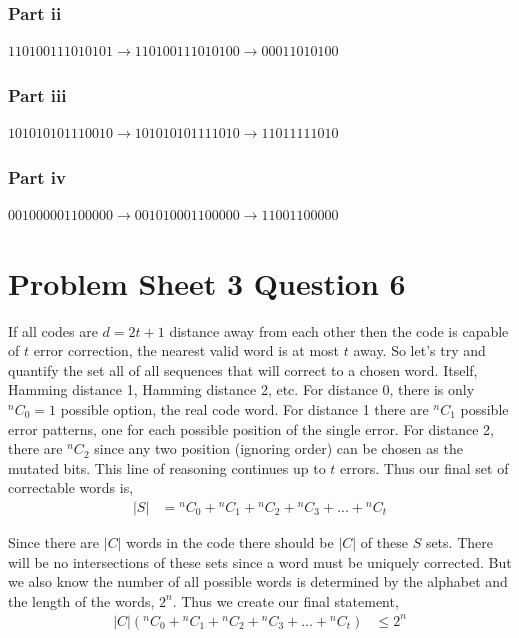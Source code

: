 \documentclass{article}
\begin{document}
\subsubsection{Part ii}
$110100111010101 \to 110100111010100 \to 00011010100$

\subsubsection{Part iii}
$101010101110010 \to 101010101111010 \to 11011111010$

\subsubsection{Part iv}
$001000001100000 \to 001010001100000 \to 11001100000$

\section{Problem Sheet 3 Question 6}
If all codes are $d=2t+1$ distance away from each other then the code is
capable of $t$ error correction, the nearest valid word is at most $t$ away.
So let's try and quantify the set all of all sequences that will correct to
a chosen word. Itself, Hamming distance 1, Hamming distance 2, etc.
For distance 0, there is only ${}^nC_0= 1$ possible option, the real code word.
For distance 1 there are ${}^nC_1$ possible error patterns, one for each
possible position of the single error. For distance 2, there are ${}^nC_2$
since any two position (ignoring order) can be chosen as the mutated bits.
This line of reasoning continues up to $t$ errors. Thus our final set of
correctable words is,
\begin{align*}
    |S| &= {}^nC_0 + {}^nC_1 + {}^nC_2 + {}^nC_3 + ... + {}^nC_t
\end{align*}

Since there are $|C|$ words in the code there should be $|C|$ of these $S$
sets. There will be no intersections of these sets since a word must be
uniquely corrected. But we also know the number of all possible words is
determined by the alphabet and the length of the words, $2^n$. Thus we
create our final statement,
\begin{align*}
    |C|\left({}^nC_0 + {}^nC_1 + {}^nC_2 + {}^nC_3 + ... + {}^nC_t\right)
    &\leq 2^n
\end{align*}
\end{document}
